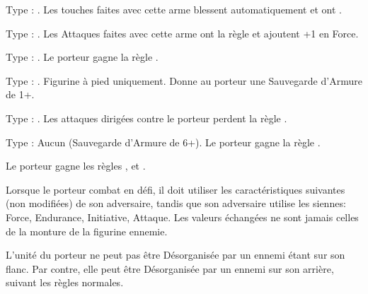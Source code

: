 \closearmyarmoury


\startarmymagicalitems

\armymagicalweapons

\startpricelist

Type : \hw{}. Les touches faites avec cette arme blessent automatiquement et ont .

Type : \hw{}. Les Attaques faites avec cette arme ont la règle \lightningreflexes{} et ajoutent +1 en Force.

Type : \gw{}. Le porteur gagne la règle \crushattack{}.

\endpricelist

\armymagicalarmour

\startpricelist

Type : \pa{}. Figurine à pied uniquement. Donne au porteur une Sauvegarde d'Armure de 1+.

Type : \pa{}. Les attaques dirigées contre le porteur perdent la règle .

Type : Aucun (Sauvegarde d'Armure de 6+). Le porteur gagne la règle \fear{}.

\endpricelist

\armytalismans

\startpricelist

Le porteur gagne les règles \distracting{}, \fireborn{} et .

\endpricelist

\armyenchanteditems

\startpricelist

Lorsque le porteur combat en défi, il doit utiliser les caractéristiques suivantes (non modifiées) de son adversaire, tandis que son adversaire utilise les siennes: Force, Endurance, Initiative, Attaque. Les valeurs échangées ne sont jamais celles de la monture de la figurine ennemie.

\endpricelist

\armymagicalbanners

\startpricelist

L'unité du porteur ne peut pas être Désorganisée par un ennemi étant sur son flanc. Par contre, elle peut être Désorganisée par un ennemi sur son arrière, suivant les règles normales.

